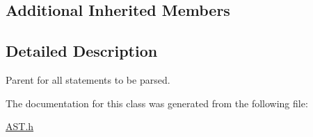 \subsection*{Additional Inherited Members}


\subsection{Detailed Description}
Parent for all statements to be parsed. 

The documentation for this class was generated from the following file\-:\begin{DoxyCompactItemize}
\item 
\hyperlink{AST_8h}{A\-S\-T.\-h}\end{DoxyCompactItemize}

